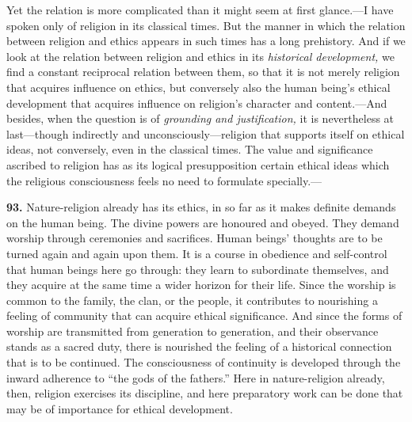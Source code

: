 \documentclass[12pt,a4paper]{book}
\newcommand{\opage}[1]{\marginnote{\footnotesize\textit{[#1]}}}
\begin{document}
Yet the relation is more complicated than it might seem at first glance.---I have spoken only of
religion in its classical times. But the manner in which the relation between religion and ethics
appears in such times has a long prehistory.
And if we look at the relation between religion and ethics in its \emph{historical development,} we
find a constant reciprocal relation between them, so that it is not merely religion that acquires
influence on ethics, but conversely also the human being's ethical development that acquires
influence on religion's character and content.---And besides, when the question is of
\emph{grounding and justification,} it is nevertheless at last---though indirectly and
unconsciously---religion that supports itself on ethical ideas, not conversely, even in the classical
times. The value and significance ascribed to religion has as its logical 
\opage{212}presupposition certain
ethical ideas which the religious consciousness feels no need to formulate specially.---

\medskip

\noindent\textbf{93.} Nature-religion already has its ethics, in so far as it makes definite demands
on the human being. The divine powers are honoured and obeyed. They demand worship through ceremonies
and sacrifices. Human beings' thoughts are to be turned again and again upon them. It is a course in
obedience and self-control that human beings here go through: they learn to subordinate themselves,
and they acquire at the same time a wider horizon for their life. Since the worship is common to the
family, the clan, or the people, it contributes to nourishing a feeling of community that can acquire
ethical significance. And since the forms of worship are transmitted from generation to generation,
and their observance stands as a sacred duty, there is nourished the feeling of a historical connection
that is to be continued. The consciousness of continuity is developed through the inward adherence to
``the gods of the fathers.'' Here in nature-religion already, then, religion exercises its discipline,
and here preparatory work can be done that may be of importance for ethical development.
\end{document}
